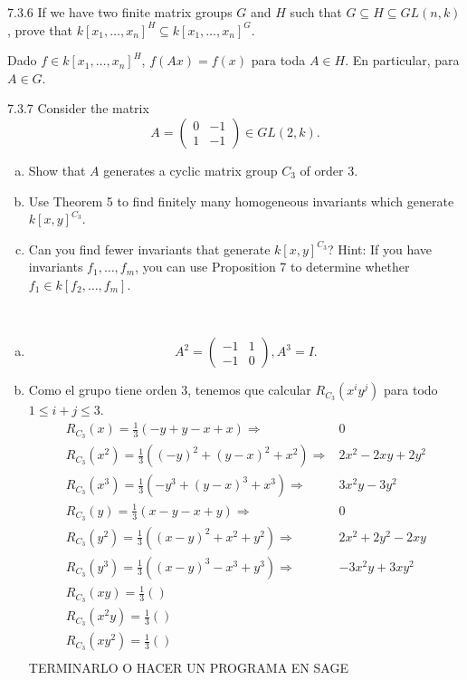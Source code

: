 \documentclass[twoside]{article}
\begin{document}
\begin{ejercicio}{7.3.6}
If we have two finite matrix groups $G$ and $H$ such that $G ⊆ H ⊆ GL(n, k)$, prove that
$k[x_1, \dots , x_n]^H ⊆ k[x_1, \dots , x_n]^G$.
\end{ejercicio}
\begin{solucion}
Dado $f\in k[x_1, \dots , x_n]^H$, $f(Ax)=f(x)$ para toda $A\in H$. En particular, para $A\in G$.
\end{solucion}
\newpage

\begin{ejercicio}{7.3.7}
Consider the matrix
$$A =
\begin{pmatrix}
0 &−1\\
1 &−1
\end{pmatrix}∈ GL(2, k).$$
\begin{enumerate}[a.]
\item Show that $A$ generates a cyclic matrix group $C_3$ of order 3.
\item Use Theorem 5 to find finitely many homogeneous invariants which generate $k[x, y]^{C_3}$.
\item Can you find fewer invariants that generate $k[x, y]^{C_3}$? Hint: If you have invariants
$f_1, \dots , f_m$, you can use Proposition 7 to determine whether $f_1 ∈ k[ f_2, \dots , f_m]$.
\end{enumerate}
\end{ejercicio}
\begin{solucion}\
\begin{enumerate}[a.]
\item 
\[
A^2=\begin{pmatrix}
-1 & 1\\
-1 & 0
\end{pmatrix}, A^3=I.
\]
\item Como el grupo tiene orden 3, tenemos que calcular $R_{C_3}(x^iy^j)$ para todo $1\leq i+j\leq 3$.
\begin{align*}
R_{C_3}(x)=\frac{1}{3}(-y+y-x+x) \Rightarrow  &0\\
R_{C_3}(x^2)=\frac{1}{3}((-y)^2+(y-x)^2+x^2)\Rightarrow & 2x^2-2xy+2y^2\\
R_{C_3}(x^3)=\frac{1}{3}(-y^3+(y-x)^3+x^3)\Rightarrow & 3x^2y-3y^2\\
R_{C_3}(y)=\frac{1}{3}(x-y-x+y)\Rightarrow & 0\\
R_{C_3}(y^2)=\frac{1}{3}((x-y)^2+x^2+y^2)\Rightarrow & 2x^2+2y^2-2xy\\
R_{C_3}(y^3)=\frac{1}{3}((x-y)^3-x^3+y^3)\Rightarrow &-3x^2y+3xy^2\\
R_{C_3}(xy)=\frac{1}{3}()\\
R_{C_3}(x^2y)=\frac{1}{3}()\\
R_{C_3}(xy^2)=\frac{1}{3}()\\
\end{align*}
TERMINARLO O HACER UN PROGRAMA EN SAGE
\end{enumerate}


\end{solucion}
\newpage
\end{document}
